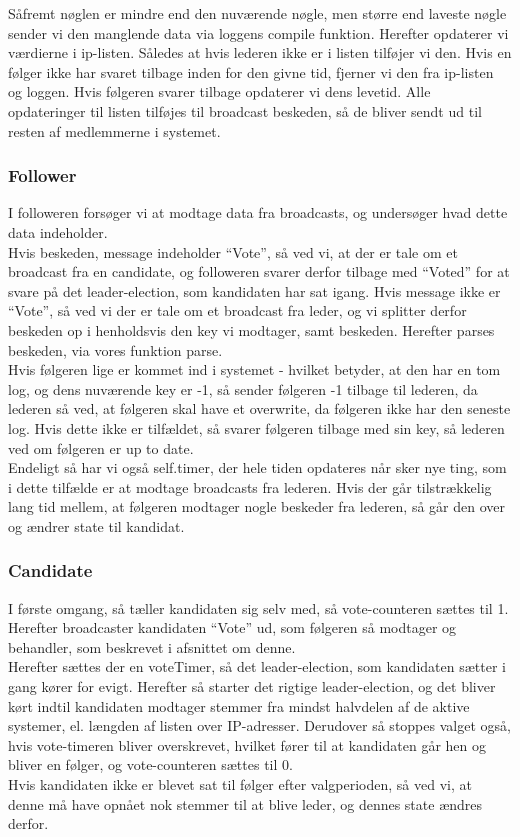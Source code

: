 \documentclass[a4paper,12pt]{article}
\begin{document}
Såfremt nøglen er mindre end den nuværende nøgle, men større end laveste nøgle sender vi den manglende data via loggens compile funktion.
Herefter opdaterer vi værdierne i ip-listen. Således at hvis lederen ikke er i listen tilføjer vi den. Hvis en følger ikke har svaret tilbage inden for den givne tid, fjerner vi den fra ip-listen og loggen. Hvis følgeren svarer tilbage opdaterer vi dens levetid. 
Alle opdateringer til listen tilføjes til broadcast beskeden, så de bliver sendt ud til resten af medlemmerne i systemet.

\subsubsection{Follower}
I followeren forsøger vi at modtage data fra broadcasts, og undersøger hvad dette data indeholder.
\\
Hvis beskeden, message indeholder “Vote”, så ved vi, at der er tale om et broadcast fra en candidate, og followeren svarer derfor tilbage med “Voted” for at svare på det leader-election, som kandidaten har sat igang.
Hvis message ikke er “Vote”, så ved vi der er tale om et broadcast fra leder, og vi splitter derfor beskeden op i henholdsvis den key vi modtager, samt beskeden.
Herefter parses beskeden, via vores funktion parse.
\\
Hvis følgeren lige er kommet ind i systemet - hvilket betyder, at den har en tom log, og dens nuværende key er -1, så sender følgeren -1 tilbage til lederen, da lederen så ved, at følgeren skal have et overwrite, da følgeren ikke har den seneste log.
Hvis dette ikke er tilfældet, så svarer følgeren tilbage med sin key, så lederen ved om følgeren er up to date.
\\[5px]
Endeligt så har vi også self.timer, der hele tiden opdateres når sker nye ting, som i dette tilfælde er at modtage broadcasts fra lederen.
Hvis der går tilstrækkelig lang tid mellem, at følgeren modtager nogle beskeder fra lederen, så går den over og ændrer state til kandidat.


\subsubsection{Candidate}
I første omgang, så tæller kandidaten sig selv med, så vote-counteren sættes til 1.
Herefter broadcaster kandidaten “Vote” ud, som følgeren så modtager og behandler, som beskrevet i afsnittet om denne.
\\
Herefter sættes der en voteTimer, så det leader-election, som kandidaten sætter i gang kører for evigt.
Herefter så starter det rigtige leader-election, og det bliver kørt indtil kandidaten modtager stemmer fra mindst halvdelen af de aktive systemer, el. længden af listen over IP-adresser. Derudover så stoppes valget også, hvis vote-timeren bliver overskrevet, hvilket fører til at kandidaten går hen og bliver en følger, og vote-counteren sættes til 0.
\\
Hvis kandidaten ikke er blevet sat til følger efter valgperioden, så ved vi, at denne må have opnået nok stemmer til at blive leder, og dennes state ændres derfor.
\end{document}
